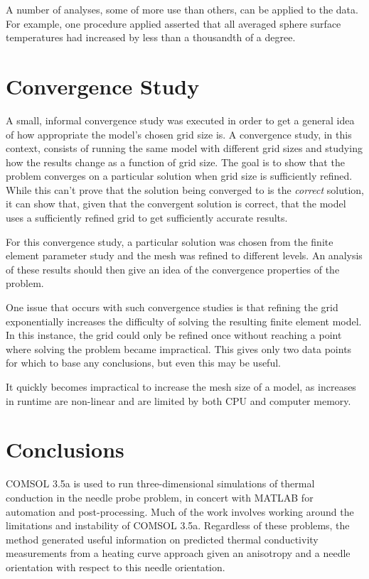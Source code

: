 A number of analyses, some of more use than others, can be applied to the
data. For example, one procedure applied asserted that all averaged sphere
surface temperatures had increased by less than a thousandth of a degree.

\section{Convergence Study}

A small, informal convergence study was executed in order to get a general idea
of how appropriate the model's chosen grid size is. A convergence study, in this
context, consists of running the same model with different grid sizes and
studying how the results change as a function of grid size.  The goal is to show
that the problem converges on a particular solution when grid size is
sufficiently refined. While this can't prove that the solution being converged
to is the \emph{correct} solution, it can show that, given that the convergent
solution is correct, that the model uses a sufficiently refined grid to get
sufficiently accurate results.

For this convergence study, a particular solution was chosen from the finite
element parameter study and the mesh was refined to different levels. An
analysis of these results should then give an idea of the convergence properties
of the problem.

One issue that occurs with such convergence studies is that refining the grid
exponentially increases the difficulty of solving the resulting finite element
model. In this instance, the grid could only be refined once without reaching
a point where solving the problem became impractical. This gives only two data
points for which to base any conclusions, but even this may be useful.

\begin{table}[h]
\centering

\caption{It quickly becomes impractical to increase the mesh size of a model, as
increases in runtime are non-linear and are limited by both CPU and computer memory.}
\label{tab:conv_runtime}
\end{table}

\section{Conclusions}

COMSOL 3.5a is used to run three-dimensional simulations of thermal conduction
in the needle probe problem, in concert with MATLAB for automation and
post-processing. Much of the work involves working around the limitations and
instability of COMSOL 3.5a. Regardless of these problems, the method generated
useful information on predicted thermal conductivity measurements from a heating
curve approach given an anisotropy and a needle orientation with respect to this
needle orientation.
